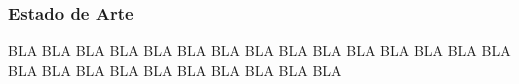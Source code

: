 \begin{frame}
\frametitle{Estado de Arte}
BLA BLA BLA BLA BLA
BLA BLA BLA BLA BLA
BLA BLA BLA BLA BLA
BLA BLA BLA BLA BLA
BLA BLA BLA BLA BLA
\end{frame}
 